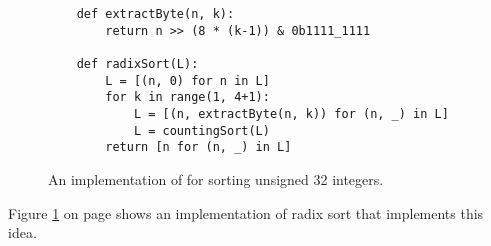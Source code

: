 \begin{figure}[!ht]
\centering
\begin{verbatim}
    def extractByte(n, k):
        return n >> (8 * (k-1)) & 0b1111_1111
    
    def radixSort(L):
        L = [(n, 0) for n in L]
        for k in range(1, 4+1):
            L = [(n, extractByte(n, k)) for (n, _) in L]
            L = countingSort(L)
        return [n for (n, _) in L]    
\end{verbatim}
\vspace*{-0.3cm}
\caption{An implementation of  for sorting unsigned 32 integers.}
\label{fig:radix-sort.stlx}
\end{figure}
Figure \ref{fig:radix-sort.stlx} on page \pageref{fig:radix-sort.stlx} shows an implementation of radix
sort that implements this idea.
